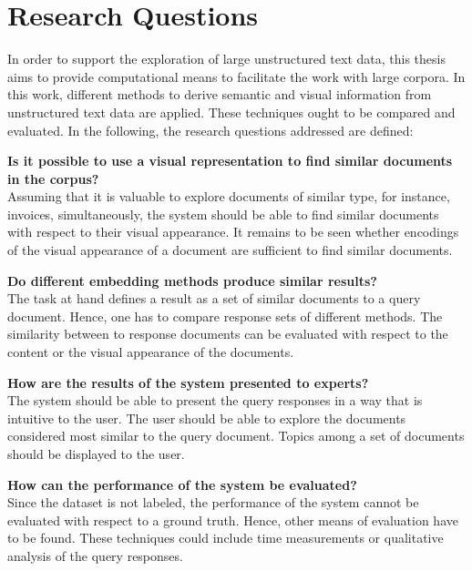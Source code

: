 \section{Research Questions}\label{sec:research-questions}

In order to support the exploration of large unstructured text data, 
this thesis aims to provide computational means to facilitate the work with large corpora.
In this work, different methods to derive semantic and visual information from unstructured text data are applied.
These techniques ought to be compared and evaluated.
In the following, the research questions addressed are defined:
\begin{questions}%
    \item \textbf{Is it possible to use a visual representation to find similar documents in the corpus?}\label{enum:rq1} \hfill \\
    Assuming that it is valuable to explore documents of similar type, for instance, invoices, simultaneously,
    the system should be able to find similar documents with respect to their visual appearance.
    It remains to be seen whether encodings of the visual appearance of a document are sufficient to find similar documents.

    \item \textbf{Do different embedding methods produce similar results?}\label{enum:rq4} \hfill \\
    The task at hand defines a result as a set of similar documents to a query document.
    Hence, one has to compare response sets of different methods.
    The similarity between to response documents can be evaluated with respect to the content or the visual appearance of the documents. 
    
    \item \textbf{How are the results of the system presented to experts?}\label{enum:rq2} \hfill \\
    The system should be able to present the query responses in a way that is intuitive to the user.
    The user should be able to explore the documents considered most similar to the query document.
    Topics among a set of documents should be displayed to the user.
    
    \item \textbf{How can the performance of the system be evaluated?}\label{enum:rq3} \hfill \\
    Since the dataset is not labeled, the performance of the system cannot be evaluated with respect to a ground truth.
    Hence, other means of evaluation have to be found.
    These techniques could include time measurements or qualitative analysis of the query responses.

\end{questions}